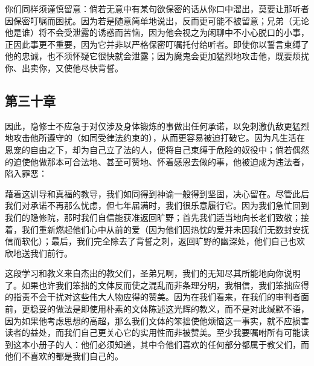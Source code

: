 \par

你们同样须谨慎留意：倘若无意中有某句欲保密的话从你口中溜出，莫要让那听者因保密叮嘱而困扰。因为若是随意简单地说出，反而更可能不被留意；兄弟（无论他是谁）将不会受泄露的诱惑而苦恼，因为他会视之为闲聊中不小心脱口的小事，正因此事更不重要，因为它并非以严格保密叮嘱托付给听者。即使你以誓言束缚了他的忠诚，也不须怀疑它很快就会泄露；因为魔鬼会更加猛烈地攻击他，既要烦扰你、出卖你，又使他尽快背誓。\par


\subsection{第三十章}

\par

因此，隐修士不应急于对仅涉及身体锻炼的事做出任何承诺，以免刺激仇敌更猛烈地攻击他所遵守的（如同受律法约束的），从而更容易被迫打破它。因为凡生活在恩宠的自由之下，却为自己立了法的人，便将自己束缚于危险的奴役中；倘若偶然的迫使他做那本可合法地、甚至可赞地、怀着感恩去做的事，他被迫成为违法者，陷入罪恶：\par

藉着这训导和真福的教导，我们如同得到神谕一般得到坚固，决心留在。尽管此后我们对承诺不再那么忧虑，但七年届满时，我们很乐意履行它。因为我们急忙回到我们的隐修院，那时我们自信能获准返回旷野；首先我们适当地向长老们致敬；接着，我们重新燃起他们心中从前的爱（因为他们因热忱的爱并未因我们无数封安抚信而软化）；最后，我们完全除去了背誓之刺，返回旷野的幽深处，他们自己也欢欣地送我们前行。\par

这段学习和教义来自杰出的教父们，圣弟兄啊，我们的无知尽其所能地向你说明了。如果也许我们笨拙的文体反而使之混乱而非条理分明，我相信，我们笨拙应得的指责不会干扰对这些伟大人物应得的赞美。因为在我们看来，在我们的审判者面前，更稳妥的做法是即使用朴素的文体陈述这光辉的教义，而不是对此缄默不语，因为如果他考虑思想的高超，那么我们文体的笨拙使他烦恼这一事实，就不应损害读者的益处，而我们自己更关心它的实用性而非被赞美。至少我要嘱咐所有可能读到这本小册子的人：他们必须知道，其中令他们喜欢的任何部分都属于教父们，而他们不喜欢的都是我们自己的。\par


